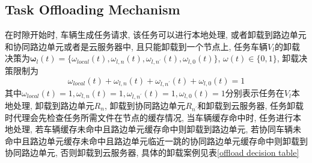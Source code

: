 \documentclass[lettersize,journal]{IEEEtran}
\begin{document}
{{\subsection{Task Offloading Mechanism}
在时隙开始时, 车辆生成任务请求, 该任务可以进行本地处理, 或者卸载到路边单元和协同路边单元或者是云服务器中, 且只能卸载到一个节点上, 任务车辆$ V_l$的卸载决策为$\boldsymbol{\omega}_{l}(t)=\{\omega_{local}(t),\omega_{l,n}(t),\omega_{l,n^{\prime}}(t),\omega_{l,0}(t) \} $, $ \omega(t)\in \{0,1\} $, 卸载决策限制为
\begin{equation}
	\omega_{local}(t)+\omega_{l,n}(t)+\omega_{l,n^{\prime}}(t)+\omega_{l,0}(t)=1
	\label{offload decision constraint}
\end{equation}
其中$\omega_{local}(t)=1,\omega_{l,n}(t)=1,\omega_{l,n^{\prime}}(t)=1,\omega_{l,0}(t)=1 $分别表示任务在$ V_l $本地处理, 卸载到路边单元$ R_n $, 卸载到协同路边单元$ R_{n^{\prime}} $和卸载到云服务器, 任务卸载时代理会先检查任务所需文件在节点的缓存情况, 当车辆缓存命中时, 任务进行本地处理, 若车辆缓存未命中且路边单元缓存命中则卸载到路边单元, 若协同车辆未命中且路边单元缓存未命中且路边单元临近一跳的协同路边单元缓存命中则卸载到协同路边单元, 否则卸载到云服务器, 具体的卸载案例见表\ref{offload decision table}
}}
\end{document}
